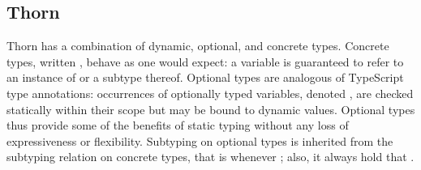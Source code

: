 \documentclass[acmsmall, anonymous, authordraft, review]{acmart} %
\begin{document}
\subsection{Thorn}

Thorn has a combination of dynamic, optional, and concrete types.  Concrete
types, written \C, behave as one would expect: a variable \HT\x\C is
guaranteed to refer to an instance of \C or a subtype thereof.  Optional
types are analogous of TypeScript type annotations: occurrences of
optionally typed variables, denoted \HT\x{\dt\C}, are checked statically
within their scope but may be bound to dynamic values.  Optional types thus
provide some of the benefits of static typing without any loss of
expressiveness or flexibility.  Subtyping on optional types is inherited
from the subtyping relation on concrete types, that is {\dt\C} \Sub {\dt\D}
whenever \C \Sub \D; also, it always hold that \C \Sub \dt\C.
\end{document}
